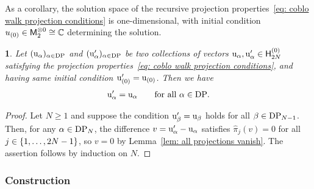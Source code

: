 \documentclass[oneside,english]{amsart}
\numberwithin{equation}{section}
\numberwithin{figure}{section}
\theoremstyle{plain}
\theoremstyle{plain}
\theoremstyle{plain}
\theoremstyle{remark}
\theoremstyle{plain}
\theoremstyle{plain}
\newtheorem{cor}[lem]{\protect\corollaryname}
\theoremstyle{plain}
\theoremstyle{plain}
\theoremstyle{plain}
\theoremstyle{plain}
\theoremstyle{plain}
\theoremstyle{plain}
\providecommand{\corollaryname}{Corollary}
\newcommand{\red}[1]{{\color{red} #1}}
\begin{document}
As a corollary, the solution space of the recursive projection
properties~\eqref{eq: coblo walk projection conditions} is one-dimensional,
with initial condition $u_{(0)} \in \mathsf{M}_2^{\otimes 0} \cong \mathbb{C}$ determining
the solution.
\begin{cor}\label{cor: uniqueness}
Let $( \mathrm{u}_\alpha )_{\alpha \in \mathrm{DP}}$ and 
$( \mathrm{u}'_\alpha )_{\alpha \in \mathrm{DP}}$ 
be two collections of vectors 
$\mathrm{u}_\alpha,\mathrm{u}'_\alpha \in \mathsf{H}_{2N}^{(0)}$
satisfying the projection properties~\eqref{eq: coblo walk projection conditions}, 
and having same initial condition $\mathrm{u}'_{(0)} = \mathrm{u}_{(0)}$. 
Then we have
\begin{align*}
\mathrm{u}'_\alpha = \mathrm{u}_\alpha\qquad\text{for all }\alpha \in \mathrm{DP}.
\end{align*}
\end{cor}
\begin{proof}
Let $N \geq 1$ and suppose the condition
$\mathrm{u}'_\beta = \mathrm{u}_\beta$ holds 
for all $\beta \in \mathrm{DP}_{N-1}$.
Then, for any $\alpha \in \mathrm{DP}_N$, 
the difference $v = \mathrm{u}'_\alpha - \mathrm{u}_\alpha$
satisfies $\hat{\pi}_j(v) = 0$ for all $j \in \left\{ 1,\ldots,2N-1\right\}$, 
so $v = 0$ by Lemma~\ref{lem: all projections vanish}. 
The assertion follows by induction on $N$.
\end{proof}

\subsubsection{\textbf{Construction}}
\end{document}
